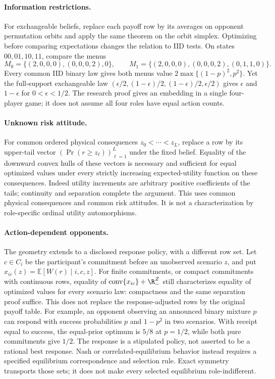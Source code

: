 \paragraph{Information restrictions.}
For exchangeable beliefs, replace each payoff row by its averages on opponent
permutation orbits and apply the same theorem on the orbit simplex. Optimizing
before comparing expectations changes the relation to IID tests. On states
$00,01,10,11$, compare the menus
\[
 M_0=\{(2,0,0,0),(0,0,0,2),0\},\qquad
 M_1=\{(2,0,0,0),(0,0,0,2),(0,1,1,0)\}.
\]
Every common IID binary law gives both menus value
$2\max\{(1-p)^2,p^2\}$. Yet the full-support exchangeable law
$(\epsilon/2,(1-\epsilon)/2,(1-\epsilon)/2,\epsilon/2)$ gives
$\epsilon$ and $1-\epsilon$ for $0<\epsilon<1/2$.
The research proof gives an embedding in a single four-player game; it does
not assume all four roles have equal action counts.

\paragraph{Unknown risk attitude.}
For common ordered physical consequences $z_0<\cdots<z_L$, replace a row by
its upper-tail vector $(\Pr(r\ge z_\ell))_{\ell=1}^L$ under the fixed belief.
Equality of the downward convex hulls of these vectors is necessary and
sufficient for equal optimized values under every strictly increasing
expected-utility function on these consequences. Indeed utility increments
are arbitrary positive coefficients of the tails; continuity and separation
complete the argument. This uses common physical consequences and common
risk attitudes. It is not a characterization by role-specific ordinal
utility automorphisms.

\paragraph{Action-dependent opponents.}
The geometry extends to a disclosed response policy, with a different row
set. Let $c\in C_i$ be the participant's commitment before an unobserved
scenario $z$, and put $x_{ic}(z)=\mathbb E[W(r)\mid i,c,z]$. For finite
commitments, or compact commitments with continuous rows, equality of
$\operatorname{conv}\{x_{ic}\}+\R_-^Z$ still characterizes equality of
optimized values for every scenario law: compactness and the same separation
proof suffice. This does not replace the response-adjusted rows by the
original payoff table. For example, an opponent observing an announced
binary mixture $p$ can respond with success probabilities $p$ and $1-p^2$
in two scenarios. With receipt equal to success, the equal-prior optimum is
$5/8$ at $p=1/2$, while both pure commitments give $1/2$.
The response is a stipulated policy, not asserted to be a rational best response.
Nash or correlated-equilibrium behavior instead requires a specified equilibrium
correspondence and selection rule. Exact symmetry transports those sets;
it does not make every selected equilibrium role-indifferent.
